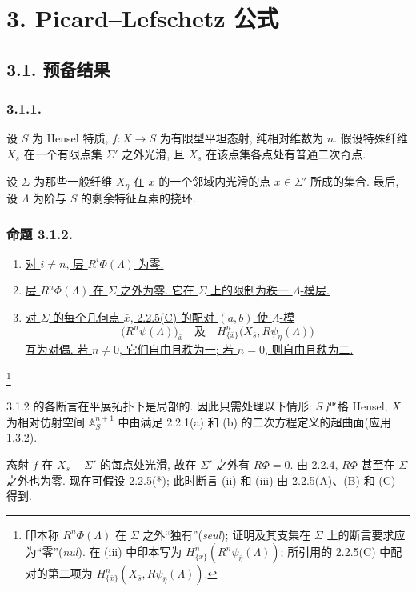 \section*{3. Picard--Lefschetz 公式}

\subsection*{3.1. 预备结果}

\subsubsection*{3.1.1.}
设 $S$ 为 Hensel 特质, $f:X\to S$ 为有限型平坦态射, 纯相对维数为 $n$. 假设特殊纤维 $X_s$ 在一个有限点集 $\Sigma'$ 之外光滑, 且 $X_s$ 在该点集各点处有普通二次奇点.

设 $\Sigma$ 为那些一般纤维 $X_\eta$ 在 $x$ 的一个邻域内光滑的点 $x\in\Sigma'$ 所成的集合. 最后, 设 $\Lambda$ 为阶与 $S$ 的剩余特征互素的挠环.

\subsubsection*{命题 3.1.2.}
\begin{enumerate}
\item[(i)] \underline{对 $i\ne n$, 层 $R^i\Phi(\Lambda)$ 为零.}

\item[(ii)] \underline{层 $R^n\Phi(\Lambda)$ 在 $\Sigma$ 之外为零. 它在 $\Sigma$ 上的限制为秩一 $\Lambda$-模层.}

\item[(iii)] \underline{对 $\Sigma$ 的每个几何点 $\bar x$, 2.2.5(C) 的配对 $(a,b)$ 使 $\Lambda$-模}
\[
\bigl(R^n\psi(\Lambda)\bigr)_{\bar x}
\quad\text{及}\quad
H^n_{\{\bar x\}}\bigl(X_{\bar s},R\psi_{\bar\eta}(\Lambda)\bigr)
\]
\underline{互为对偶. 若 $n\ne0$, 它们自由且秩为一; 若 $n=0$, 则自由且秩为二.}
\end{enumerate}
\footnote{印本称 $R^n\Phi(\Lambda)$ 在 $\Sigma$ 之外“独有”(\emph{seul}); 证明及其支集在 $\Sigma$ 上的断言要求应为“零”(\emph{nul}). 在 (iii) 中印本写为 $H^n_{\{\bar x\}}(R^n\psi_{\bar\eta}(\Lambda))$; 所引用的 2.2.5(C) 中配对的第二项为 $H^n_{\{\bar x\}}(X_{\bar s},R\psi_{\bar\eta}(\Lambda))$.}

3.1.2 的各断言在平展拓扑下是局部的. 因此只需处理以下情形: $S$ 严格 Hensel, $X$ 为相对仿射空间 $\mathbb A^{n+1}_S$ 中由满足 2.2.1(a) 和 (b) 的二次方程定义的超曲面(应用 1.3.2).

态射 $f$ 在 $X_s-\Sigma'$ 的每点处光滑, 故在 $\Sigma'$ 之外有 $R\Phi=0$. 由 2.2.4, $R\Phi$ 甚至在 $\Sigma$ 之外也为零. 现在可假设 2.2.5(*); 此时断言 (ii) 和 (iii) 由 2.2.5(A)、(B) 和 (C) 得到.